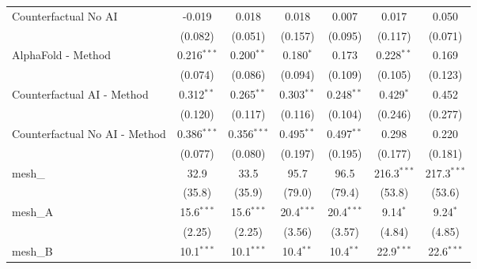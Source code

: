 \begin{tabular}{lcccccc}
   Counterfactual No AI                                        & -0.019         & 0.018          & 0.018         & 0.007         & 0.017         & 0.050\\   
                                                               & (0.082)        & (0.051)        & (0.157)       & (0.095)       & (0.117)       & (0.071)\\   
   AlphaFold - Method                                          & 0.216$^{***}$  & 0.200$^{**}$   & 0.180$^{*}$   & 0.173         & 0.228$^{**}$  & 0.169\\   
                                                               & (0.074)        & (0.086)        & (0.094)       & (0.109)       & (0.105)       & (0.123)\\   
   Counterfactual AI - Method                                  & 0.312$^{**}$   & 0.265$^{**}$   & 0.303$^{**}$  & 0.248$^{**}$  & 0.429$^{*}$   & 0.452\\   
                                                               & (0.120)        & (0.117)        & (0.116)       & (0.104)       & (0.246)       & (0.277)\\   
   Counterfactual No AI - Method                               & 0.386$^{***}$  & 0.356$^{***}$  & 0.495$^{**}$  & 0.497$^{**}$  & 0.298         & 0.220\\   
                                                               & (0.077)        & (0.080)        & (0.197)       & (0.195)       & (0.177)       & (0.181)\\   
   mesh\_                                                      & 32.9           & 33.5           & 95.7          & 96.5          & 216.3$^{***}$ & 217.3$^{***}$\\   
                                                               & (35.8)         & (35.9)         & (79.0)        & (79.4)        & (53.8)        & (53.6)\\   
   mesh\_A                                                     & 15.6$^{***}$   & 15.6$^{***}$   & 20.4$^{***}$  & 20.4$^{***}$  & 9.14$^{*}$    & 9.24$^{*}$\\   
                                                               & (2.25)         & (2.25)         & (3.56)        & (3.57)        & (4.84)        & (4.85)\\   
   mesh\_B                                                     & 10.1$^{***}$   & 10.1$^{***}$   & 10.4$^{**}$   & 10.4$^{**}$   & 22.9$^{***}$  & 22.6$^{***}$\\   

\end{tabular}
